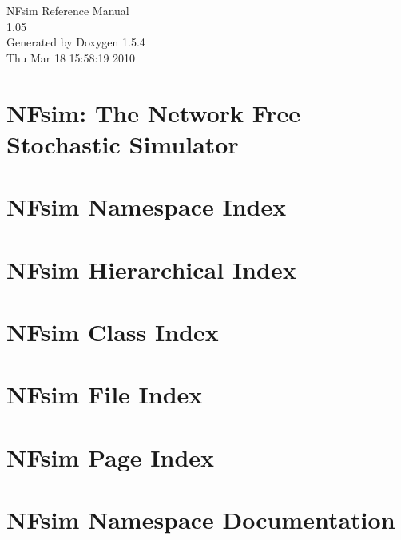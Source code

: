 \documentclass[a4paper]{book}
\begin{document}
\begin{titlepage}
\vspace*{7cm}
\begin{center}
{\Large NFsim Reference Manual\\[1ex]\large 1.05 }\\
\vspace*{1cm}
{\large Generated by Doxygen 1.5.4}\\
\vspace*{0.5cm}
{\small Thu Mar 18 15:58:19 2010}\\
\end{center}
\end{titlepage}
\clearemptydoublepage
{}
\tableofcontents
\clearemptydoublepage
{}
\chapter{NFsim: The Network Free Stochastic Simulator }
\label{index}
\chapter{NFsim Namespace Index}

\chapter{NFsim Hierarchical Index}

\chapter{NFsim Class Index}

\chapter{NFsim File Index}

\chapter{NFsim Page Index}

\chapter{NFsim Namespace Documentation}









\end{document}
